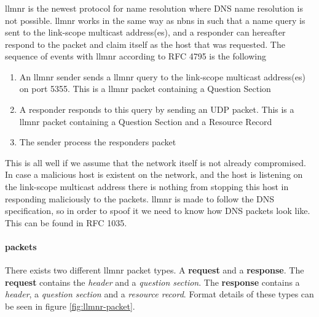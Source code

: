 \documentclass{article}
\begin{document}
\subsubsection{}
\label{sec:llmnr}
\gls{llmnr} is the newest protocol for name resolution where DNS name resolution is not possible\cite{url:rfc:llmnr}. \gls{llmnr} works in the same way as \gls{nbns} in such that a name query is sent to the link-scope multicast address(es), and a responder can hereafter respond to the packet and claim itself as the host that was requested. The sequence of events with \gls{llmnr} according to RFC 4795\cite{url:rfc:llmnr} is the following
\begin{enumerate}
	\item An \gls{llmnr} sender sends a \gls{llmnr} query to the link-scope multicast address(es) on port 5355. This is a \gls{llmnr} packet containing a Question Section
	\item A responder responds to this query by sending an UDP packet. This is a \gls{llmnr} packet containing a Question Section and a Resource Record
	\item The sender process the responders packet
\end{enumerate}

This is all well if we assume that the network itself is not already compromised. In case a malicious host is existent on the network, and the host is listening on the link-scope multicast address there is nothing from stopping this host in responding maliciously to the packets. \gls{llmnr} is made to follow the DNS specification, so in order to spoof it we need to know how DNS packets look like. This can be found in RFC 1035\cite{url:rfc:dns}.

\paragraph{ packets}

There exists two different \gls{llmnr} packet types. A \textbf{request} and a \textbf{response}. The \textbf{request} contains the \emph{header} and a \emph{question section}. The \textbf{response} contains a \emph{header}, a \emph{question section} and a \emph{resource record}. Format details of these types can be seen in figure \ref{fig:llmnr-packet}.
\end{document}
